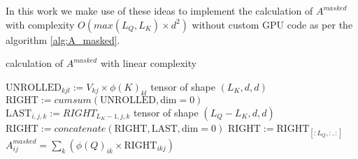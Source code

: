 In this work we make use of these ideas to implement the calculation of
 $A^{masked}$ with complexity $O(max(L_Q, L_K) \times d^2)$ without
 custom GPU code as per the algorithm \ref{alg:A_masked}.

\begin{algorithm}[H]
	\caption{calculation of $A^{masked}$ with linear complexity}
	\label{alg:A_masked}
	$\text{UNROLLED}_{kjl} := V_{kj} \times \phi(K)_{kl}$ tensor of shape $(L_K, d, d)$\\
	$\text{RIGHT} := cumsum\left(\text{UNROLLED}, \text{dim}=0\right)$\\
	{
		$\text{LAST}_{i,j,k} := RIGHT_{L_K-1,j,k}$ tensor of shape $(L_Q - L_K, d, d)$\\
		$\text{RIGHT} := concatenate\left(\text{RIGHT}, \text{LAST}, \text{dim}=0\right)$
	}
	{
		$\text{RIGHT} := \text{RIGHT}_{[:L_Q, :, :]}$
	}
	$A^{masked}_{ij} = \sum_k \left( \phi(Q)_{ik} \times \text{RIGHT}_{ikj} \right)$
\end{algorithm}
